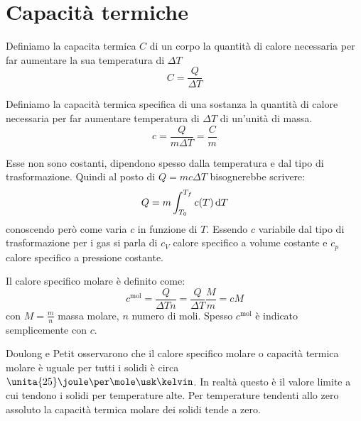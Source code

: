 \section{Capacità termiche}
\begin{Def}
Definiamo la capacita termica $C$ di un corpo la quantità di calore necessaria per far aumentare la sua temperatura di $\Delta T$
\begin{equation}
C=\frac{Q}{\Delta T}
\end{equation}
\end{Def}
\begin{Def}
Definiamo la capacità termica specifica di una sostanza la quantità di calore necessaria per far aumentare  temperatura di $\Delta T$ di un'unità di massa.
\begin{equation}
c=\frac{Q}{m\Delta T}=\frac{C}{m}
\end{equation}
\end{Def}
Esse non sono costanti, dipendono spesso dalla temperatura e dal tipo di trasformazione. Quindi al posto di $Q=mc\Delta T$ bisognerebbe scrivere:
\begin{equation}
Q=m\int_{T_0}^{T_f}c(T)\,\mathrm{d} T
\end{equation}
conoscendo però come varia $c$ in funzione di $T$. Essendo $c$ variabile dal tipo di trasformazione per i gas si parla di $c_V$ calore specifico a volume costante e $c_p$ calore specifico a pressione costante.
\begin{Def}
Il calore specifico molare è definito come:
\begin{equation}
c^{\text{mol}}=\frac{Q}{\Delta T n}=\frac{Q}{\Delta T}\frac{M}{m}=cM
\end{equation}
con $M=\frac{m}{n}$ massa molare, $n$ numero di moli. Spesso $c^{\text{mol}}$ è indicato semplicemente con $c$.
\end{Def}

Doulong e Petit osservarono che il calore specifico molare o capacità termica molare è uguale per tutti i solidi è circa $\unita{25}\joule\per\mole\usk\kelvin$. In realtà questo è il valore limite a cui tendono i solidi per temperature alte. Per temperature tendenti allo zero assoluto la capacità termica molare dei solidi tende a zero.


